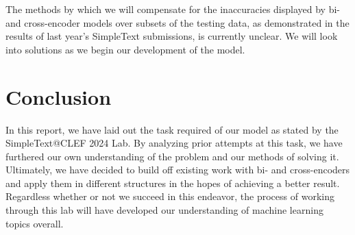 \documentclass[runningheads]{llncs}
\begin{document}
The methods by which we will compensate for the inaccuracies displayed by bi- and cross-encoder models over subsets of the testing data, as demonstrated in the results of last year's SimpleText submissions\cite{clef}, is currently unclear. We will look into solutions as we begin our development of the model.

\section{Conclusion} \label{conclusion}
In this report, we have laid out the task required of our model as stated by the SimpleText@CLEF 2024 Lab. By analyzing prior attempts at this task, we have furthered our own understanding of the problem and our methods of solving it. Ultimately, we have decided to build off existing work with bi- and cross-encoders and apply them in different structures in the hopes of achieving a better result. Regardless whether or not we succeed in this endeavor, the process of working through this lab will have developed our understanding of machine learning topics overall.
%
%
\printbibliography
\end{document}

